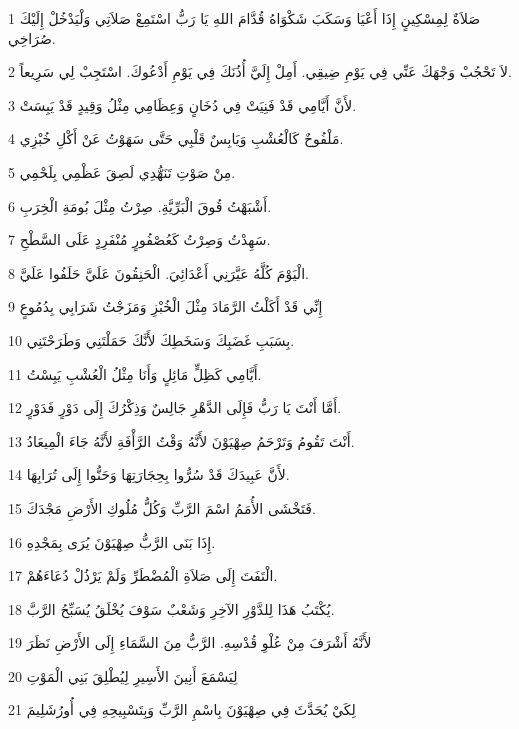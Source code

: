 \par 1 صَلاَةٌ لِمِسْكِينٍ إِذَا أَعْيَا وَسَكَبَ شَكْوَاهُ قُدَّامَ اللهِ يَا رَبُّ اسْتَمِعْ صَلاَتِي وَلْيَدْخُلْ إِلَيْكَ صُرَاخِي.
\par 2 لاَ تَحْجُبْ وَجْهَكَ عَنِّي فِي يَوْمِ ضِيقِي. أَمِلْ إِلَيَّ أُذُنَكَ فِي يَوْمِ أَدْعُوكَ. اسْتَجِبْ لِي سَرِيعاً.
\par 3 لأَنَّ أَيَّامِي قَدْ فَنِيَتْ فِي دُخَانٍ وَعِظَامِي مِثْلُ وَقِيدٍ قَدْ يَبِسَتْ.
\par 4 مَلْفُوحٌ كَالْعُشْبِ وَيَابِسٌ قَلْبِي حَتَّى سَهَوْتُ عَنْ أَكْلِ خُبْزِي.
\par 5 مِنْ صَوْتِ تَنَهُّدِي لَصِقَ عَظْمِي بِلَحْمِي.
\par 6 أَشْبَهْتُ قُوقَ الْبَرِّيَّةِ. صِرْتُ مِثْلَ بُومَةِ الْخِرَبِ.
\par 7 سَهِدْتُ وَصِرْتُ كَعُصْفُورٍ مُنْفَرِدٍ عَلَى السَّطْحِ.
\par 8 الْيَوْمَ كُلَّهُ عَيَّرَنِي أَعْدَائِيَ. الْحَنِقُونَ عَلَيَّ حَلَفُوا عَلَيَّ.
\par 9 إِنِّي قَدْ أَكَلْتُ الرَّمَادَ مِثْلَ الْخُبْزِ وَمَزَجْتُ شَرَابِي بِدُمُوعٍ
\par 10 بِسَبَبِ غَضَبِكَ وَسَخَطِكَ لأَنَّكَ حَمَلْتَنِي وَطَرَحْتَنِي.
\par 11 أَيَّامِي كَظِلٍّ مَائِلٍ وَأَنَا مِثْلُ الْعُشْبِ يَبِسْتُ.
\par 12 أَمَّا أَنْتَ يَا رَبُّ فَإِلَى الدَّهْرِ جَالِسٌ وَذِكْرُكَ إِلَى دَوْرٍ فَدَوْرٍ.
\par 13 أَنْتَ تَقُومُ وَتَرْحَمُ صِهْيَوْنَ لأَنَّهُ وَقْتُ الرَّأْفَةِ لأَنَّهُ جَاءَ الْمِيعَادُ.
\par 14 لأَنَّ عَبِيدَكَ قَدْ سُرُّوا بِحِجَارَتِهَا وَحَنُّوا إِلَى تُرَابِهَا.
\par 15 فَتَخْشَى الأُمَمُ اسْمَ الرَّبِّ وَكُلُّ مُلُوكِ الأَرْضِ مَجْدَكَ.
\par 16 إِذَا بَنَى الرَّبُّ صِهْيَوْنَ يُرَى بِمَجْدِهِ.
\par 17 الْتَفَتَ إِلَى صَلاَةِ الْمُضْطَرِّ وَلَمْ يَرْذُلْ دُعَاءَهُمْ.
\par 18 يُكْتَبُ هَذَا لِلدَّوْرِ الآخِرِ وَشَعْبٌ سَوْفَ يُخْلَقُ يُسَبِّحُ الرَّبَّ.
\par 19 لأَنَّهُ أَشْرَفَ مِنْ عُلْوِ قُدْسِهِ. الرَّبُّ مِنَ السَّمَاءِ إِلَى الأَرْضِ نَظَرَ
\par 20 لِيَسْمَعَ أَنِينَ الأَسِيرِ لِيُطْلِقَ بَنِي الْمَوْتِ
\par 21 لِكَيْ يُحَدَّثَ فِي صِهْيَوْنَ بِاسْمِ الرَّبِّ وَبِتَسْبِيحِهِ فِي أُورُشَلِيمَ
